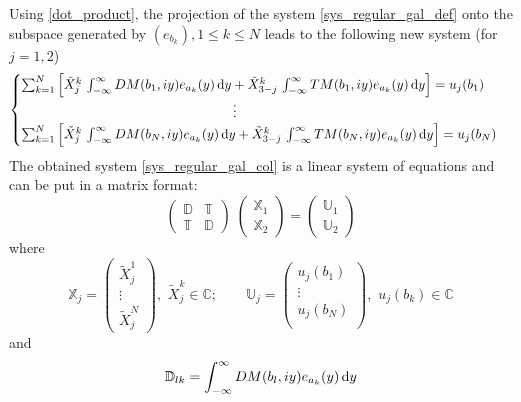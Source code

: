 Using \eqref{dot_product}, the projection of the system \eqref{sys_regular_gal_def} onto the subspace generated by $(e_{b_k}), 1\leq k\leq N$ leads to the following new system (for $j=1,2$)
\begin{equation}
\label{sys_regular_gal_col}
\begin{cases}
\sum_{k=1}^N \left[ \tilde{X}_j^k \, \int_{-\infty}^\infty DM(b_1,iy) e_{a_k}(y) \, {\rm d} y + \tilde{X}_{3-j}^k \, \int_{-\infty}^\infty TM(b_1,iy) e_{a_k}(y) \, {\rm d} y \right] = u_j(b_1) \\
 \qquad \qquad \qquad \qquad \qquad \qquad \qquad \qquad \vdots \\
\sum_{k=1}^N \left[ \tilde{X}_j^k \, \int_{-\infty}^\infty DM(b_N,iy) e_{a_k}(y) \, {\rm d} y + \tilde{X}_{3-j}^k \, \int_{-\infty}^\infty TM(b_N,iy) e_{a_k}(y) \, {\rm d} y \right] = u_j(b_N)
\end{cases}
\end{equation}
The obtained system \eqref{sys_regular_gal_col} is a linear system of equations and can be put in a matrix format:
\begin{equation}
\label{Syst_lineaire}
\begin{pmatrix}
\mathbb{D} & \mathbb{T}\\
\mathbb{T} & \mathbb{D}
\end{pmatrix}
\;
\begin{pmatrix}
\mathbb{X}_1\\
\mathbb{X}_2
\end{pmatrix}
 = 
\begin{pmatrix}
\mathbb{U}_1\\
\mathbb{U}_2
\end{pmatrix}
\end{equation}
where
\begin{equation}
\mathbb{X}_j = 
\begin{pmatrix}
\tilde{X}_j^1 \\
\vdots \\
\tilde{X}_j^N
\end{pmatrix},
\, \, \tilde{X}_j^k \in \mathbb{C}; \qquad
\mathbb{U}_j = 
\begin{pmatrix}
u_j(b_1)\\
\vdots\\
u_j(b_N)\\
\end{pmatrix},
\, \, u_j(b_k) \in \mathbb{C}
\end{equation} 
and 
\begin{equation}
\label{D_matrix}
\mathbb{D}_{lk} = \int_{-\infty}^\infty DM(b_l,iy) e_{a_k}(y) \, {\rm d} y
\end{equation}
